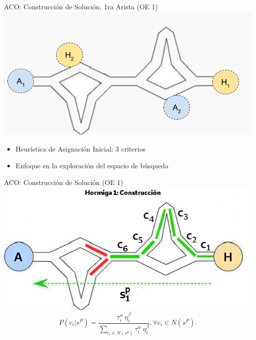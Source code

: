 
\begin{frame}{ACO: Construcci\'on de Soluci\'on, 1ra Arista (OE 1)}
    \centering
    \includegraphics[scale=0.5]{Pictures/ant-initial-edge.png}
    \begin{itemize}
        \item Heur\'istica de Asignaci\'on Inicial: 3 criterios
        \item Enfoque en la exploraci\'on del espacio de b\'usqueda
    \end{itemize}
\end{frame}

\begin{frame}{ACO: Construcci\'on de Soluci\'on (OE 1)}
\centering
\includegraphics[scale=0.35]{Pictures/ACO-ant-Constr-choices.png}
        \begin{equation}
P(c_{i} | s^{P}) = \frac
        {\tau_{i}^{\alpha} ~ \eta_{i}^{\beta}}
        {\sum\limits_{c_{i}\in N(s^p)}{\tau_{i}^{\alpha} ~ \eta_{i}^{\beta} } }, \forall c_{i} \in N(s^{P}).
\label{eq:antProbabilities}
\end{equation}
\end{frame}

